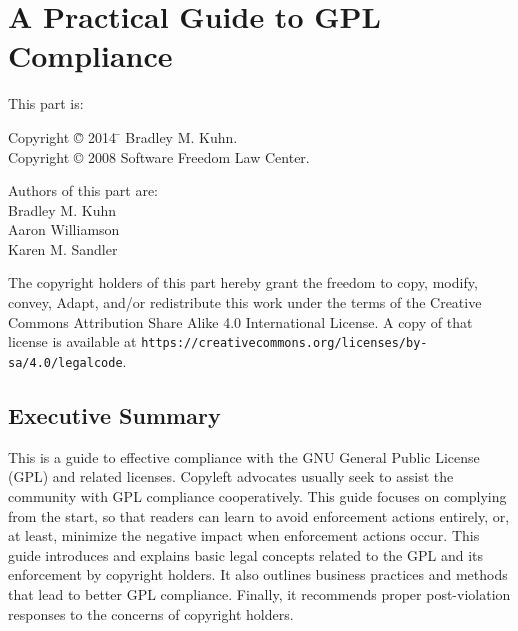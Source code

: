 
\part{A Practical Guide to GPL Compliance}
\label{gpl-compliance-guide}

{\parindent 0in
This part is: \\
\begin{tabbing}
Copyright \= \copyright{} 2014 \= \hspace{.2in} Bradley M. Kuhn. \\
Copyright \> \copyright{} 2008 \> \hspace{.2in} Software Freedom Law Center. \\
\end{tabbing}

\vspace{1in}

\begin{center}
Authors of this part are: \\

Bradley M. Kuhn \\
Aaron Williamson \\
Karen M. Sandler \\

\vspace{3in}

The copyright holders of this part hereby grant the freedom to copy, modify,
convey, Adapt, and/or redistribute this work under the terms of the Creative
Commons Attribution Share Alike 4.0 International License.  A copy of that
license is available at
\verb=https://creativecommons.org/licenses/by-sa/4.0/legalcode=. 
\end{center}
}

\bigskip

\chapter*{Executive Summary}

This is a guide to effective compliance with the GNU General Public
License (GPL) and related licenses.  Copyleft advocates
usually seek to assist the community with
GPL compliance cooperatively.   This guide focuses on complying from the
start, so that readers can learn to avoid enforcement actions entirely, or, at
least, minimize  the negative impact when enforcement actions occur.
This guide  introduces and explains basic legal concepts related to the GPL and its
enforcement by copyright holders. It also outlines business practices and
methods that lead to better GPL compliance.  Finally, it recommends proper
post-violation responses to the concerns of copyright holders.

